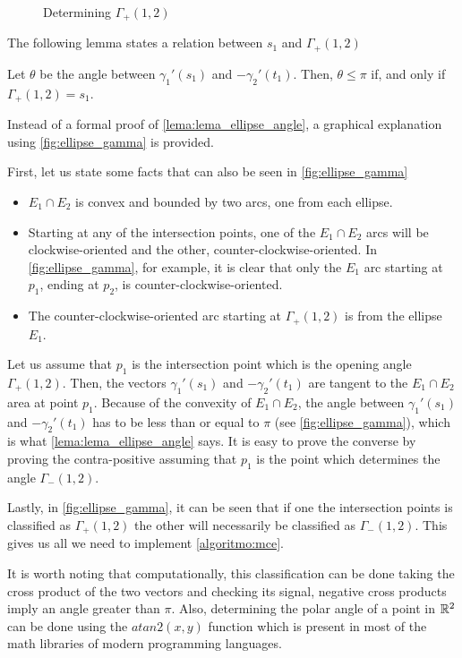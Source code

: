 \begin{figure}[H]
\centering

    \caption{Determining $\Gamma_+(1,2)$}
    
    \fautor
    \label{fig:ellipse_gamma}
\end{figure}

The following lemma states a relation between $s_1$ and $\Gamma_+(1,2)$

\begin{lema}\label{lema:lema_ellipse_angle}
	Let $\theta$ be the angle between $\gamma_1'(s_1)$ and $-\gamma_2'(t_1)$. Then, $\theta \le \pi$ if, and only if $\Gamma_+(1,2)=s_1$.
\end{lema}

Instead of a formal proof of \autoref{lema:lema_ellipse_angle}, a graphical explanation using \autoref{fig:ellipse_gamma} is provided.


First, let us state some facts that can also be seen in \autoref{fig:ellipse_gamma}

\begin{itemize}
    \item $E_1 \cap E_2$ is convex and bounded by two arcs, one from each ellipse.
    \item Starting at any of the intersection points, one of the $E_1 \cap E_2$ arcs will be clockwise-oriented and the other, counter-clockwise-oriented. In \autoref{fig:ellipse_gamma}, for example, it is clear that only the $E_1$ arc starting at $p_1$, ending at $p_2$, is counter-clockwise-oriented.  
    
    
    \item The counter-clockwise-oriented arc starting at $\Gamma_+(1,2)$ is from the ellipse $E_1$.
\end{itemize}


Let us assume that $p_1$ is the intersection point which is the opening angle $\Gamma_+(1,2)$. Then, the vectors $\gamma_1'(s_1)$ and $-\gamma_2'(t_1)$ are tangent to the $E_1 \cap E_2$ area at point $p_1$. Because of the convexity of $E_1 \cap E_2$, the angle between $\gamma_1'(s_1)$ and $-\gamma_2'(t_1)$ has to be less than or equal to $\pi$ (see \autoref{fig:ellipse_gamma}), which is what \autoref{lema:lema_ellipse_angle} says. It is easy to prove the converse by proving the contra-positive assuming that $p_1$ is the point which determines the angle $\Gamma_-(1,2)$.

Lastly, in \autoref{fig:ellipse_gamma}, it can be seen that if one the intersection points is classified as $\Gamma_+(1,2)$ the other will necessarily be classified as $\Gamma_-(1,2)$. This gives us all we need to implement \autoref{algoritmo:mce}.

It is worth noting that computationally, this classification can be done taking the cross product of the two vectors and checking its signal, negative cross products imply an angle greater than $\pi$. Also, determining the polar angle of a point in $\mathbb{R}^2$ can be done using the $atan2(x,y)$ function which is present in most of the math libraries of modern programming languages.

